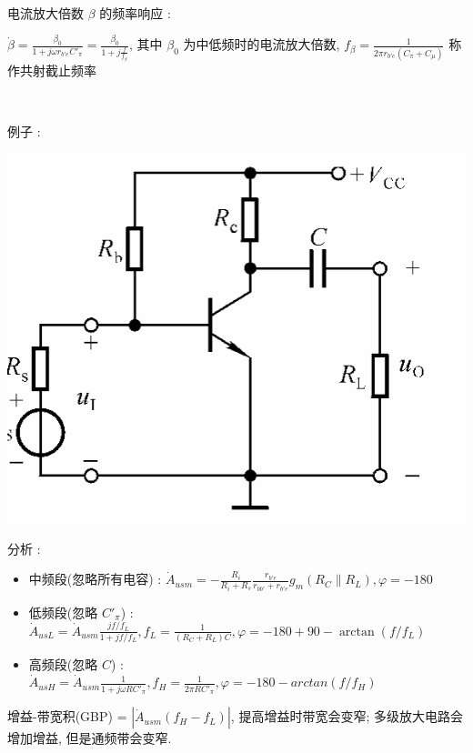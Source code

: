 \documentclass[UTF8, 12pt]{ctexart}
\begin{document}
	~

	\noindent
	电流放大倍数 $ \beta $ 的频率响应 :

	$ \dot{\beta} = \frac{\beta_{0}}{1+j\omega r_{b'e}C'_{\pi}} = \frac{\beta_{0}}{1+j\frac{f}{f_{\beta}}} $, 其中 $ \beta_{0} $ 为中低频时的电流放大倍数, $ f_{\beta} = \frac{1}{2\pi r_{b'e}(C_{\pi}+C_{\mu})} $ 称作共射截止频率

	~

	\noindent 例子 :

	\includegraphics[scale = 0.4]{05/单管放大电路电路图.png}

	分析 :
	\begin{itemize}[leftmargin = 4em]
		\item 中频段(忽略所有电容) : $ \dot{A}_{usm} = -\frac{R_{i}}{R_{i}+R_{s}}\frac{r_{b'e}}{r_{bb'}+r_{b'e}}g_{m}(R_{C} \parallel R_{L}), \varphi = -180 $
		\item 低频段(忽略 $ C'_{\pi} $) : $ \dot{A}_{usL} = \dot{A}_{usm}\frac{jf/f_{L}}{1+jf/f_{L}}, f_{L} = \frac{1}{(R_{C}+R_{L})C}, \varphi = -180+90-\arctan(f/f_{L}) $
		\item 高频段(忽略 $ C $) : $ \dot{A}_{usH} = \dot{A}_{usm}\frac{1}{1+j\omega RC'_{\pi}}, f_{H} = \frac{1}{2\pi RC'_{\pi}}, \varphi = -180-arctan(f/f_{H}) $
	\end{itemize}

	增益-带宽积(GBP) = $ |\dot{A}_{usm}(f_{H}-f_{L})| $, 提高增益时带宽会变窄; 多级放大电路会增加增益, 但是通频带会变窄.
\end{document}

